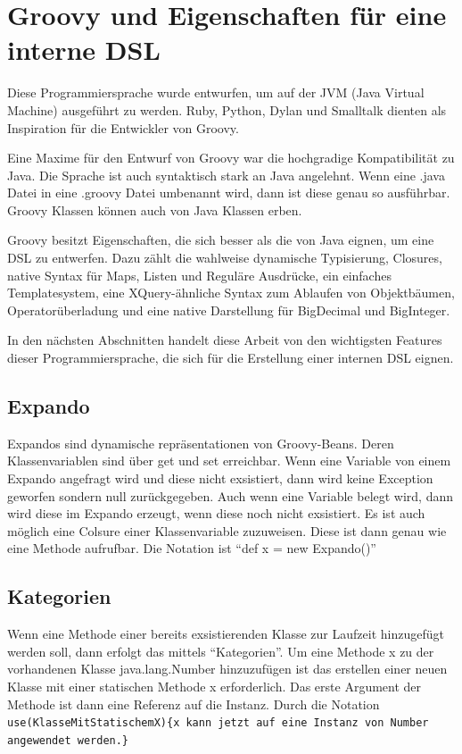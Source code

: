 \documentclass[11pt,english,ngerman, headsepline]{scrreprt}
\begin{document}
\section{Groovy und Eigenschaften für eine interne DSL}

Diese Programmiersprache wurde entwurfen, um auf der JVM (Java Virtual Machine)
ausgeführt zu werden. Ruby, Python, Dylan und Smalltalk dienten als Inspiration
für die Entwickler von Groovy.

Eine Maxime für den Entwurf von Groovy war die hochgradige Kompatibilität zu
Java. Die Sprache ist auch syntaktisch stark an Java angelehnt. Wenn eine .java
Datei in eine .groovy Datei umbenannt wird, dann ist diese genau so ausführbar.
Groovy Klassen können auch von Java Klassen erben.

Groovy besitzt Eigenschaften, die sich besser als die von Java eignen, um eine
DSL zu entwerfen. Dazu zählt die wahlweise dynamische Typisierung, Closures,
native Syntax für Maps, Listen und Reguläre Ausdrücke, ein einfaches
Templatesystem, eine
XQuery-ähnliche Syntax zum Ablaufen von Objektbäumen, Operatorüberladung und
eine native Darstellung für BigDecimal und BigInteger.  

In den nächsten Abschnitten handelt diese Arbeit von den wichtigsten Features
dieser Programmiersprache, die sich für die Erstellung einer internen DSL
eignen.


\subsection{Expando}\label{expando}

Expandos sind dynamische repräsentationen von Groovy-Beans. Deren
Klassenvariablen sind über get und set erreichbar. Wenn eine Variable von einem
Expando angefragt wird und diese nicht exsistiert, dann wird
keine Exception geworfen sondern null zurückgegeben. Auch wenn eine Variable
belegt wird, dann wird diese im Expando erzeugt, wenn diese noch nicht
exsistiert. Es ist auch möglich eine Colsure einer Klassenvariable zuzuweisen.
Diese ist dann genau wie eine Methode aufrufbar. Die Notation ist ``def x =
new Expando()''

\subsection{Kategorien}

Wenn eine Methode einer bereits exsistierenden Klasse zur Laufzeit hinzugefügt
werden soll, dann erfolgt das mittels ``Kategorien''.
Um eine Methode x zu der vorhandenen Klasse java.lang.Number hinzuzufügen ist
das erstellen einer neuen Klasse mit einer statischen Methode x erforderlich.
Das erste Argument der Methode ist dann eine Referenz auf die Instanz.
Durch die Notation \texttt{use(KlasseMitStatischemX)\{x kann jetzt auf eine
Instanz von Number angewendet werden.\}}
\end{document}
